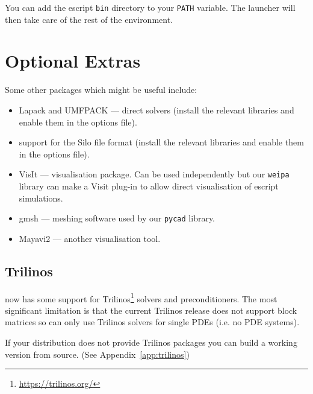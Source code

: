 \begin{optionalstep}
You can add the escript \texttt{bin} directory to your \texttt{PATH} variable.
The launcher will then take care of the rest of the environment.
\end{optionalstep}

\section{Optional Extras}

Some other packages which might be useful include:
\begin{itemize}
 \item Lapack and UMFPACK --- direct solvers (install the relevant libraries and enable them in the options file).
 \item support for the Silo file format (install the relevant libraries and enable them in the options file).
 \item VisIt --- visualisation package. Can be used independently but our \texttt{weipa} library can make a Visit 
plug-in to allow direct visualisation of escript simulations.
 \item gmsh --- meshing software used by our \texttt{pycad} library.
 \item Mayavi2 --- another visualisation tool.
\end{itemize}


\subsection{Trilinos}
\escript now has some support for Trilinos\footnote{\url{https://trilinos.org/}}
solvers and preconditioners.
The most significant limitation is that the current Trilinos release does not
support block matrices so \escript can only use Trilinos solvers for single
PDEs (i.e. no PDE systems).

If your distribution does not provide Trilinos packages you can build a working
version from source. (See Appendix~\ref{app:trilinos})

